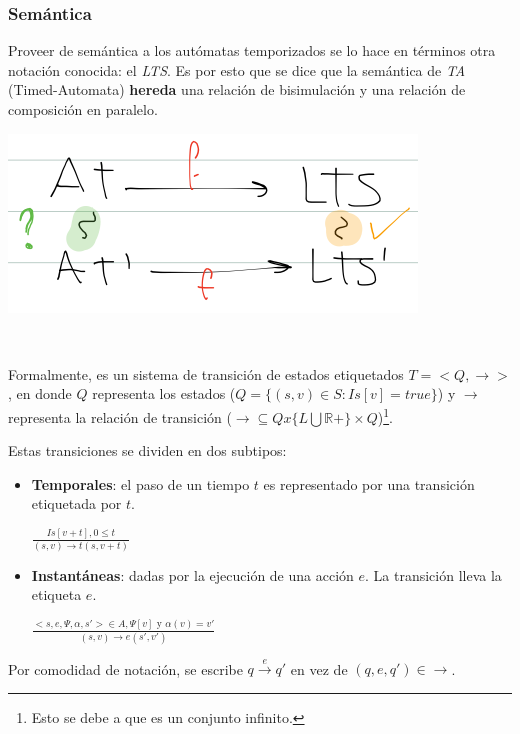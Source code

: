 \documentclass[]{article}
\begin{document}
\subsubsection{Semántica}
Proveer de semántica a los autómatas temporizados se lo hace en términos otra notación conocida: el \textit{LTS}. Es por esto que se dice que la semántica de \textit{TA} (Timed-Automata) \textbf{hereda} una relación de bisimulación y una relación de composición en paralelo.

\begin{center}
	\includegraphics[scale=0.6]{AuTemp.png}
\end{center}

~\newline

Formalmente, es un sistema de transición de estados etiquetados $T=<Q,\rightarrow>$, en donde $Q$ representa los estados ($Q=\{(s,v)\in S : Is[v]=true\}$) y $\rightarrow$ representa la relación de transición ($\rightarrow \subseteq Q x \{L \bigcup \mathbb{R}+\} \times Q$)\footnote{Esto se debe a que es un conjunto infinito.}.

Estas transiciones se dividen en dos subtipos:
\begin{itemize}
	\item \textbf{Temporales}: el paso de un tiempo $t$ es representado por una transición etiquetada por $t$.
	\begin{center}
		$\displaystyle \frac{Is[v+t], 0\leq t}{(s,v)\rightarrow t (s,v+t)}$
	\end{center}
	\item \textbf{Instantáneas}: dadas por la ejecución de una acción $e$. La transición lleva la etiqueta $e$.
	\begin{center}
		$\displaystyle \frac{<s,e,\Psi,\alpha,s'>\in A, \Psi[v] \text{ y } \alpha(v)=v'}{(s,v)\rightarrow e (s',v')}$
	\end{center}
\end{itemize}

Por comodidad de notación, se escribe $q \overset{e}{\rightarrow} q'$ en vez de $(q,e,q')\in\rightarrow$.
\end{document}
